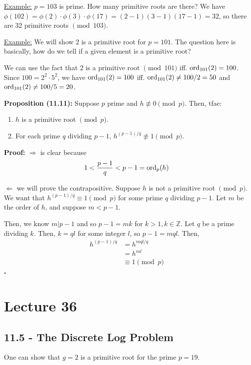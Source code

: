 \documentclass{article}
\newcommand*{\qed}{\hfill$\square$}%
\newcommand*{\zz}{\mathbb{Z}}%
\begin{document}
\underline{Example:} $p=103$ is prime. How many primitive roots are there? We have $\phi(102)=\phi(2)\cdot \phi(3)\cdot \phi(17)=(2-1)(3-1)(17-1)=32$, so there are 32 primitive roots $\pmod{103}$.

\underline{Example:} We will show $2$ is a primitive root for $p=101$. The question here is basically, how do we tell if a given element is a primitive root? 

We can use the fact that $2$ is a primitive root $\pmod{101}$ iff. $\text{ord}_{101}(2)=100$. Since $100=2^2\cdot 5^2$, we have $\text{ord}_{101}(2)=100$ iff. $\text{ord}_{101}(2)\neq 100/2=50$ and $\text{ord}_{101}(2)\neq 100/5=20$.

\textbf{Proposition (11.11):} Suppose $p$ prime and $h\not\equiv 0\pmod p$. Then, tfae: \begin{enumerate}
    \item $h$ is a primitive root $\pmod p$.
    \item For each prime $q$ dividing $p-1$, $h^{(p-1)/q}\not\equiv 1\pmod p$.
\end{enumerate}

\textbf{Proof:} $\Rightarrow$ is clear because \begin{align*}
    1<\frac{p-1}{q}<p-1=\text{ord}_p(h)
\end{align*}

$\Leftarrow$ we will prove the contrapositive. Suppose $h$ is not a primitive root $\pmod p$. We want that $h^{(p-1)/q}\equiv 1\pmod p$ for some prime $q$ dividing $p-1$. Let $m$ be the order of $h$, and suppose $m<p-1$.

Then, we know $m|p-1$ and so $p-1=mk$ for $k>1,k\in\zz$. Let $q$ be a prime dividing $k$. Then, $k=ql$ for some integer $l$, so $p-1=mql$. Then, \begin{align*}
    h^{(p-1)/q}&=h^{mql/q}\\
    &=h^{ml}\\
    &\equiv 1\pmod p
\end{align*} \qed

\section{Lecture 36}

\subsection{11.5 - The Discrete Log Problem}

One can show that $g=2$ is a primitive root for the prime $p=19$. 
\end{document}

